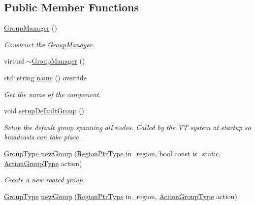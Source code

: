 \subsection*{Public Member Functions}
\begin{DoxyCompactItemize}
\item 
\hyperlink{structvt_1_1group_1_1_group_manager_acfab15afbf80d7b0aa8d95171167b251}{Group\+Manager} ()
\begin{DoxyCompactList}\small\item\em Construct the \hyperlink{structvt_1_1group_1_1_group_manager}{Group\+Manager}. \end{DoxyCompactList}\item 
virtual \hyperlink{structvt_1_1group_1_1_group_manager_a87c2b3dc934de17d0ec1372957b234e5}{$\sim$\+Group\+Manager} ()
\item 
std\+::string \hyperlink{structvt_1_1group_1_1_group_manager_a46802e85936e68f9bebc844af1793da3}{name} () override
\begin{DoxyCompactList}\small\item\em Get the name of the component. \end{DoxyCompactList}\item 
void \hyperlink{structvt_1_1group_1_1_group_manager_ac0eb535f215f0edf1bed601b4338220f}{setup\+Default\+Group} ()
\begin{DoxyCompactList}\small\item\em Setup the default group spanning all nodes. Called by the VT system at startup so broadcasts can take place. \end{DoxyCompactList}\item 
\hyperlink{namespacevt_a27b5e4411c9b6140c49100e050e2f743}{Group\+Type} \hyperlink{structvt_1_1group_1_1_group_manager_a076330445139abce77e1f6ab6e4358c5}{new\+Group} (\hyperlink{structvt_1_1group_1_1_group_manager_a9192e585fc2f99bfd5a6ff65fc21c40b}{Region\+Ptr\+Type} in\+\_\+region, bool const is\+\_\+static, \hyperlink{structvt_1_1group_1_1_group_manager_ae871c5871ad62b530220009c1ee4d4b9}{Action\+Group\+Type} action)
\begin{DoxyCompactList}\small\item\em Create a new rooted group. \end{DoxyCompactList}\item 
\hyperlink{namespacevt_a27b5e4411c9b6140c49100e050e2f743}{Group\+Type} \hyperlink{structvt_1_1group_1_1_group_manager_af2986f6eacd693d9906cb397e6e2a706}{new\+Group} (\hyperlink{structvt_1_1group_1_1_group_manager_a9192e585fc2f99bfd5a6ff65fc21c40b}{Region\+Ptr\+Type} in\+\_\+region, \hyperlink{structvt_1_1group_1_1_group_manager_ae871c5871ad62b530220009c1ee4d4b9}{Action\+Group\+Type} action)

\end{DoxyCompactItemize}
